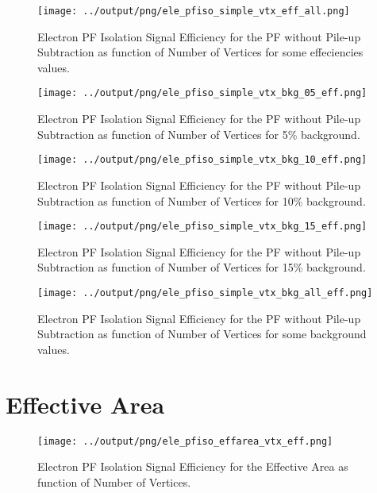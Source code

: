 \documentclass[11pt]{book}
\begin{document}
\begin{figure}[htb]
\centering
\texttt{[image: ../output/png/ele\_pfiso\_simple\_vtx\_eff\_all.png]}
\caption{Electron PF Isolation Signal Efficiency for the PF without Pile-up Subtraction as function of Number of Vertices for some effeciencies values.}
\label{fig:ele_pfiso_vtx_eff_simple_eff_all}
\end{figure}

\begin{figure}[htb]
\centering
\texttt{[image: ../output/png/ele\_pfiso\_simple\_vtx\_bkg\_05\_eff.png]}
\caption{Electron PF Isolation Signal Efficiency for the PF without Pile-up Subtraction as function of Number of Vertices for 5\% background.}
\label{fig:ele_pfiso_vtx_eff_simple_bkg_05_eff}
\end{figure}

\begin{figure}[htb]
\centering
\texttt{[image: ../output/png/ele\_pfiso\_simple\_vtx\_bkg\_10\_eff.png]}
\caption{Electron PF Isolation Signal Efficiency for the PF without Pile-up Subtraction as function of Number of Vertices for 10\% background.}
\label{fig:ele_pfiso_vtx_eff_simple_bkg_10_eff}
\end{figure}

\begin{figure}[htb]
\centering
\texttt{[image: ../output/png/ele\_pfiso\_simple\_vtx\_bkg\_15\_eff.png]}
\caption{Electron PF Isolation Signal Efficiency for the PF without Pile-up Subtraction as function of Number of Vertices for 15\% background.}
\label{fig:ele_pfiso_vtx_eff_simple_bkg_15_eff}
\end{figure}

\begin{figure}[htb]
\centering
\texttt{[image: ../output/png/ele\_pfiso\_simple\_vtx\_bkg\_all\_eff.png]}
\caption{Electron PF Isolation Signal Efficiency for the PF without Pile-up Subtraction as function of Number of Vertices for some background values.}
\label{fig:ele_pfiso_vtx_eff_simple_bkg_all_eff}
\end{figure}
\clearpage

\section{Effective Area}
\begin{figure}[htb]
\centering
\texttt{[image: ../output/png/ele\_pfiso\_effarea\_vtx\_eff.png]}
\caption{Electron PF Isolation Signal Efficiency for the Effective Area as function of Number of Vertices.}
\label{fig:ele_pfiso_vtx_eff_effarea}
\end{figure}
\end{document}
